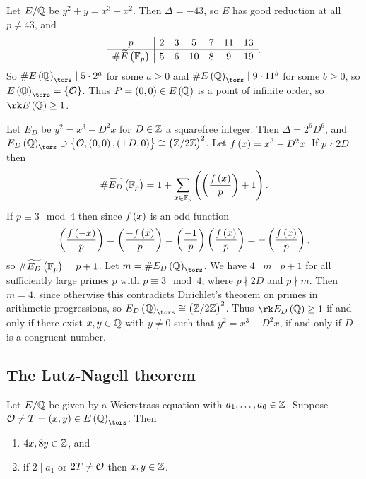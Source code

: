 \begin{example*}
Let $ E / \mathbb{Q} $ be $ y^2 + y = x^3 + x^2 $. Then $ \Delta = -43 $, so $ E $ has good reduction at all $ p \ne 43 $, and
$$
\begin{array}{c|cccccc}
p & 2 & 3 & 5 & 7 & 11 & 13 \\
\hline
\#\widetilde{E}\br{\FF_p} & 5 & 6 & 10 & 8 & 9 & 19
\end{array}.
$$
So $ \#E\br{\QQ}_{\tors} \mid 5 \cdot 2^a $ for some $ a \ge 0 $ and $ \#E\br{\QQ}_{\tors} \mid 9 \cdot 11^b $ for some $ b \ge 0 $, so $ E\br{\QQ}_{\tors} = \cbr{\OOO} $. Thus $ P = \br{0, 0} \in E\br{\QQ} $ is a point of infinite order, so $ \rk E\br{\QQ} \ge 1 $.
\end{example*}

\begin{example*}
Let $ E_D $ be $ y^2 = x^3 - D^2x $ for $ D \in \mathbb{Z} $ a squarefree integer. Then $ \Delta = 2^6D^6 $, and $ E_D\br{\QQ}_{\tors} \supset \cbr{\OOO, \br{0, 0}, \br{\pm D, 0}} \cong \br{\ZZ / 2\ZZ}^2 $. Let $ f\br{x} = x^3 - D^2x $. If $ p \nmid 2D $ then
$$ \#\widetilde{E_D}\br{\FF_p} = 1 + \sum_{x \in \FF_p} \br{\br{\dfrac{f\br{x}}{p}} + 1}. $$
If $ p \equiv 3 \mod 4 $ then since $ f\br{x} $ is an odd function
$$ \br{\dfrac{f\br{-x}}{p}} = \br{\dfrac{-f\br{x}}{p}} = \br{\dfrac{-1}{p}}\br{\dfrac{f\br{x}}{p}} = -\br{\dfrac{f\br{x}}{p}}, $$
so $ \#\widetilde{E_D}\br{\FF_p} = p + 1 $. Let $ m = \#E_D\br{\QQ}_{\tors} $. We have $ 4 \mid m \mid p + 1 $ for all sufficiently large primes $ p $ with $ p \equiv 3 \mod 4 $, where $ p \nmid 2D $ and $ p \nmid m $. Then $ m = 4 $, since otherwise this contradicts Dirichlet's theorem on primes in arithmetic progressions, so $ E_D\br{\QQ}_{\tors} \cong \br{\ZZ / 2\ZZ}^2 $. Thus $ \rk E_D\br{\QQ} \ge 1 $ if and only if there exist $ x, y \in \mathbb{Q} $ with $ y \ne 0 $ such that $ y^2 = x^3 - D^2x $, if and only if $ D $ is a congruent number.
\end{example*}

\pagebreak

\subsection{The Lutz-Nagell theorem}

\begin{lemma}
\label{lem:10.4}
Let $ E / \mathbb{Q} $ be given by a Weierstrass equation with $ a_1, \dots, a_6 \in \mathbb{Z} $. Suppose $ \OOO \ne T = \br{x, y} \in E\br{\QQ}_{\tors} $. Then
\begin{enumerate}
\item $ 4x, 8y \in \mathbb{Z} $, and
\item if $ 2 \mid a_1 $ or $ 2T \ne \mathcal{O} $ then $ x, y \in \mathbb{Z} $.
\end{enumerate}
\end{lemma}

